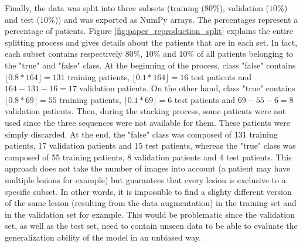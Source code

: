 Finally, the data was split into three subsets (training ($80$\%), validation ($10$\%) and test ($10$\%)) and was exported as NumPy arrays. The percentages represent a percentage of patients. Figure \ref{fig:paper_reproduction_split} explains the entire splitting process and gives details about the patients that are in each set. In fact, each subset contains respectively 80\%, 10\% and 10\% of all patients belonging to the "true" and "false" class. At the beginning of the process, class "false" contains $\lfloor 0.8 * 164 \rfloor = 131$ training patients, $\lfloor 0.1 * 164 \rfloor = 16$ test patients and $164 - 131 - 16 = 17$ validation patients. On the other hand, class "true" contains $\lfloor 0.8 * 69 \rfloor = 55$ training patients, $\lfloor 0.1 * 69 \rfloor = 6$ test patients and $69 - 55 - 6 = 8$ validation patients. Then, during the stacking process, some patients were not used since the three sequences were not available for them. These patients were simply discarded. At the end, the "false" class was composed of 131 training patients, 17 validation patients and 15 test patients, whereas the "true" class was composed of 55 training patients, 8 validation patients and 4 test patients. This approach does not take the number of images into account (a patient may have multiple lesions for example) but guarantees that every lesion is exclusive to a specific subset. In other words, it is impossible to find a slighty different version of the same lesion (resulting from the data augmentation) in the training set and in the validation set for example. This would be problematic since the validation set, as well as the test set, need to contain unseen data to be able to evaluate the generalization ability of the model in an unbiased way. 

